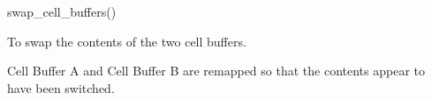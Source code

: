 

\format
swap\_cell\_buffers()

\purpose

To swap the contents of the two cell buffers.

\description

Cell Buffer A and Cell Buffer B are remapped so that the contents appear to have been switched.
